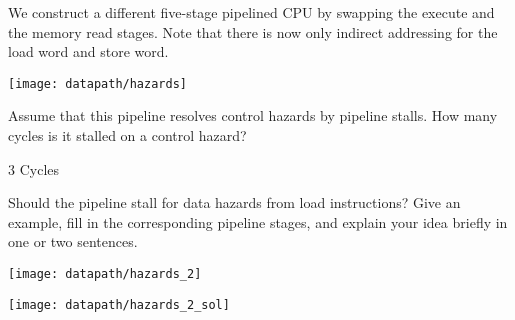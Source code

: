 \begin{blocksection}
We construct a different five-stage pipelined CPU by swapping the execute and the memory read stages. Note that there is now only indirect addressing for the load word and store word.

\texttt{[image: datapath/hazards]}

\question Assume that this pipeline resolves control hazards by pipeline stalls. How many cycles is it stalled on a control hazard?

\begin{solution}[0.5in]
3 Cycles
\end{solution}

\question Should the pipeline stall for data hazards from load instructions? Give an example, fill in the corresponding pipeline stages, and explain your idea briefly in one or two sentences. 

\texttt{[image: datapath/hazards\_2]}

\begin{solution}
\texttt{[image: datapath/hazards\_2\_sol]}
\end{solution}

\end{blocksection}